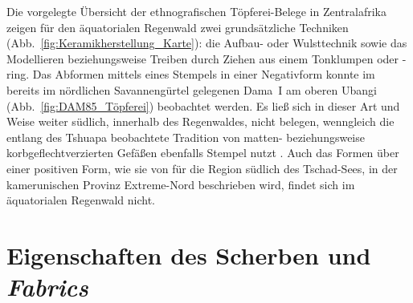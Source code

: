Die vorgelegte Übersicht der ethnografischen Töpferei-Belege in Zentralafrika zeigen für den äquatorialen Regenwald zwei grundsätzliche Techniken (Abb.~\ref{fig:Keramikherstellung_Karte}): die Aufbau- oder Wulsttechnik \parencite[44]{Drost.1967} sowie das Modellieren beziehungsweise Treiben \parencite{Drost.1967} durch Ziehen aus einem Tonklumpen oder -ring. Das Abformen \parencite{Drost.1967} mittels eines Stempels in einer Negativform konnte im bereits im nördlichen Savannengürtel gelegenen Dama~I am oberen Ubangi (Abb.~\ref{fig:DAM85_Töpferei}) beobachtet werden. Es ließ sich in dieser Art und Weise weiter südlich, innerhalb des Regenwaldes, nicht belegen, wenngleich die entlang des Tshuapa beobachtete Tradition von matten- beziehungsweise korbgeflechtverzierten Gefäßen ebenfalls Stempel nutzt \parencite[188, 196--197]{Wotzka.1995}. Auch das Formen über einer positiven Form, wie sie von \textcite[229f. Abb.~1]{Langlois.2001} für die Region südlich des Tschad-Sees, in der kamerunischen Provinz Extreme-Nord beschrieben wird, findet sich im äquatorialen Regenwald nicht.


\section{Eigenschaften des Scherben und \textit{Fabrics}}\label{sec:Herstellung2_Fabric}


